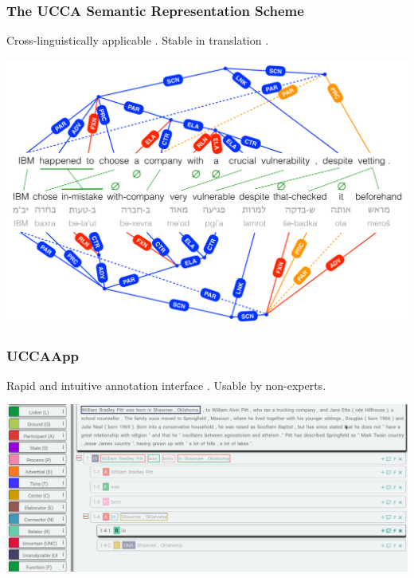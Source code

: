 \documentclass[t]{beamer}
\begin{document}
\begin{frame}
\frametitle{The UCCA Semantic Representation Scheme}
Cross-linguistically applicable \cite{abend2013universal}.
Stable in translation \cite{sulem2015conceptual}.
\vfill
\begin{adjustbox}{center}
  \includegraphics[width=\textwidth,height=\textheight,keepaspectratio]{crosslinguistic.png}
\end{adjustbox}
\end{frame}

\begin{frame}
\frametitle{UCCAApp}
Rapid and intuitive annotation interface \cite{abend2017uccaapp}.
Usable by non-experts.
\vfill
\begin{adjustbox}{center}
  \includegraphics[width=\pagewidth,height=\textheight,keepaspectratio]{uccaapp.png}
\end{adjustbox}
\end{frame}
\end{document}
